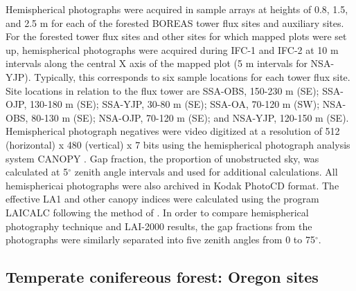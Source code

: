 Hemispherical photographs were acquired in sample arrays at heights of 0.8, 1.5, and 2.5 m for each of the forested BOREAS tower flux sites and auxiliary sites. For the forested tower flux sites and other sites for which mapped plots were set up, hemispherical photographs were acquired during IFC-1 and IFC-2 at 10 m intervals along the central X axis of the mapped plot (5 m intervals for NSA-YJP). Typically, this corresponds to six sample locations for each tower flux site. Site locations in relation to the flux tower are SSA-OBS, 150-230 m (SE); SSA-OJP, 130-180 m (SE); SSA-YJP, 30-80 m (SE); SSA-OA, 70-120 m (SW); NSA-OBS, 80-130 m (SE); NSA-OJP, 70-120 m (SE); and NSA-YJP, 120-150 m (SE). %
Hemispherical photograph negatives were video digitized at a resolution of 512 (horizontal) x 480 (vertical) x 7 bits using the hemispherical photograph analysis system CANOPY \citep{Rich1989,Rich1990}. Gap fraction, the proportion of unobstructed sky, was calculated at 5$^{\circ}$ zenith angle intervals and used for additional calculations. All hemisphericai photographs were also archived in Kodak PhotoCD format. The effective LA1 and other canopy indices were calculated using the program LAICALC \citep{Rich1995} following the method of \citet{Chen1991}. In order to compare hemispherical photography technique and LAI-2000 results, the gap fractions from the photographs were similarly separated into five zenith angles from 0 to 75$^{\circ}$.

\subsection{Temperate conifereous forest: Oregon sites}

